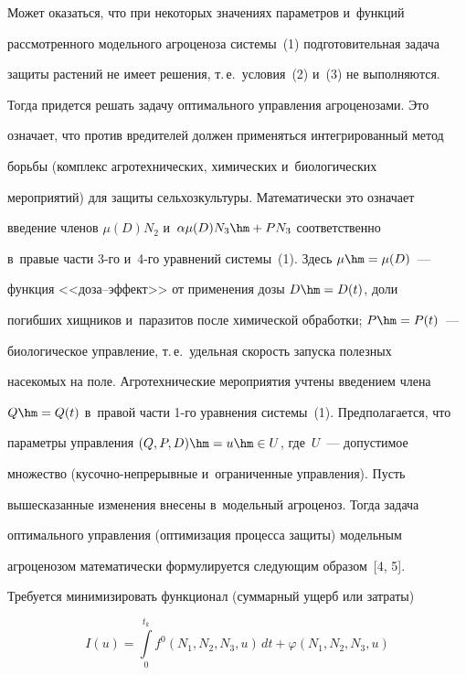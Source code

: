 \smallskip





     Может оказаться, что при некоторых значениях параметров и~функций 


рассмотренного модельного агроценоза системы~(1) подготовительная задача 


защиты растений не имеет решения, т.\,е.\ условия~(2) и~(3) не выполняются. 


Тогда придется решать задачу оптимального управления агроценозами. Это 


означает, что против вредителей должен применяться интегрированный метод 


борьбы (комплекс агротехнических, химических и~биологических 


мероприятий) для защиты сельхозкультуры. Математически это означает 


введение членов $\mu(D)N_2$ и~$\alpha\mu(D)N_3\hm+ PN_3$ соответственно 


в~правые части 3-го и~4-го уравнений системы~(1). Здесь $\mu\hm= \mu(D)$~--- 


функция <<доза--эф\-фект>> от применения дозы $D\hm=D(t)$, доли 


погибших хищников и~паразитов после химической обработки; $P\hm= P(t)$~--- 


биологическое управление, т.\,е.\ удельная скорость запуска полезных 


насекомых на поле. Агротехнические мероприятия учтены введением члена 


$Q\hm= Q(t)$ в~правой части 1-го уравнения системы~(1). Предполагается, что 


параметры управления $(Q,P,D)\hm= u\hm\in U$, где~$U$~--- допустимое 


множество (ку\-соч\-но-не\-пре\-рыв\-ные и~ограниченные управления). Пусть 


вышесказанные изменения внесены в~модельный агроценоз. Тогда задача 


оптимального управ\-ле\-ния (оптимизация процесса защиты) модельным 


агроценозом математически формулируется следующим образом~[4, 5].


     


Требуется минимизировать функционал (суммарный ущерб или затраты)


\begin{equation}


I(u)= \int\limits_0^{t_k} f^0\left( N_1, N_2, N_3,u\right)\,dt +\varphi\left( N_1, N_2, 


N_3, u\right)


\label{e4-od}


\end{equation}


